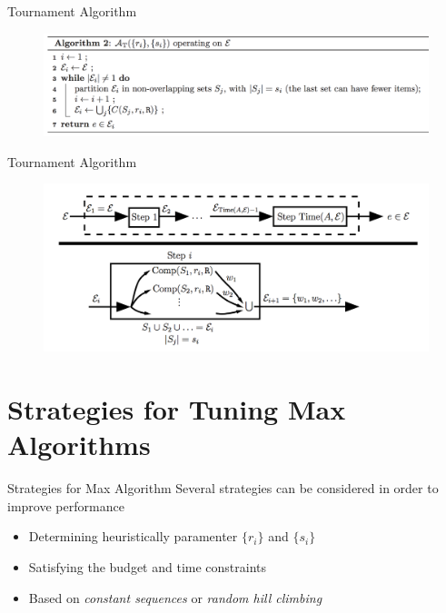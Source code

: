 \documentclass{beamer}
\begin{document}
\begin{frame}{Tournament Algorithm}
			\begin{figure}
				\centering
				\includegraphics[scale=0.35]{images/tournament_a.png}
			\end{figure}
\end{frame}
\begin{frame}{Tournament Algorithm}
			\begin{figure}
				\centering
				\includegraphics[scale=0.45]{images/tournament_g.png}
			\end{figure}
\end{frame}

\section{Strategies for Tuning Max Algorithms}
\begin{frame}
\end{frame}

\begin{frame}{Strategies for Max Algorithm}
	Several strategies can be considered in order to improve performance 
	\begin{itemize}
	\item Determining heuristically paramenter $\{r_i\}$ and $\{s_i\}$
	\item Satisfying the budget and time constraints
	\item Based on \emph{constant sequences} or \emph{random hill climbing}
	\end{itemize}
		
\end{frame}
\end{document}
